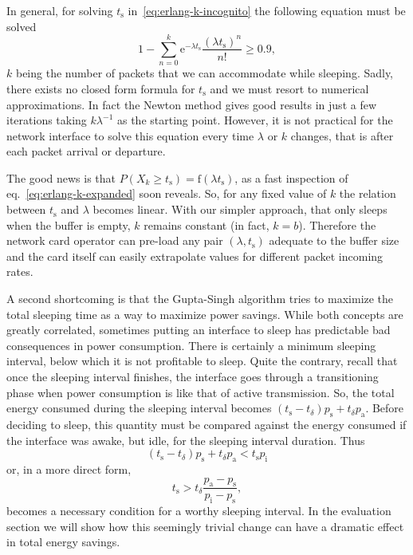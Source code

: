 \documentclass[conference,english]{IEEEtran}
\begin{document}
In general, for solving $t_{\mathrm{s}}$ in~\eqref{eq:erlang-k-incognito} the
following equation must be solved
\begin{equation}
  \label{eq:erlang-k-expanded}
  1-\sum_{n=0}^k \mathrm{e}^{-\lambda t_{\mathrm{s}}} 
  \frac{(\lambda t_{\mathrm{s}})^n}{n!} \ge 0.9,
\end{equation}
$k$ being the number of packets that we can accommodate while sleeping. Sadly,
there exists no closed form formula for $t_{\mathrm{s}}$ and we must resort to
numerical approximations. In fact the Newton method gives good results in just
a few iterations taking $k \lambda^{-1}$ as the starting point. However, it is
not practical for the network interface to solve this equation every time
$\lambda$ or $k$ changes, that is after each packet arrival or departure.

The good news is that $P(X_k \ge t_{\mathrm{s}}) = \mathrm{f}(\lambda
t_{\mathrm{s}})$, as a fast inspection of eq.~\eqref{eq:erlang-k-expanded}
soon reveals. So, for any fixed value of $k$ the relation between
$t_{\mathrm{s}}$ and $\lambda$ becomes linear. With our simpler approach, that
only sleeps when the buffer is empty, $k$ remains constant (in fact, $k=b$).
Therefore the network card operator can pre-load any pair $(\lambda,
t_{\mathrm{s}})$ adequate to the buffer size and the card itself can easily
extrapolate values for different packet incoming rates.

A second shortcoming is that the Gupta-Singh algorithm tries to maximize the
total sleeping time as a way to maximize power savings. While both concepts
are greatly correlated, sometimes putting an interface to sleep has
predictable bad consequences in power consumption. There is certainly a
minimum sleeping interval, below which it is not profitable to sleep. Quite
the contrary, recall that once the sleeping interval finishes, the interface
goes through a transitioning phase when power consumption is like that of
active transmission. So, the total energy consumed during the sleeping
interval becomes $(t_{\mathrm{s}} - t_{\delta})p_{\mathrm{s}} + t_{\delta}
p_{\mathrm{a}}$. Before deciding to sleep, this quantity must be compared
against the energy consumed if the interface was awake, but idle, for the
sleeping interval duration. Thus
\begin{equation*}
  (t_{\mathrm{s}}-t_{\delta}) p_{\mathrm{s}} + t_{\delta} p_{\mathrm{a}} < t_{\mathrm{s}}
  p_{\mathrm{i}}
\end{equation*}
or, in a more direct form,
\begin{equation}
  \label{eq:profitable-sleeping}
  t_{\mathrm{s}} > t_{\delta}\frac{p_{\mathrm{a}}-p_{\mathrm{s}}}{p_{\mathrm{i}} - p_{\mathrm{s}}},
\end{equation}
becomes a necessary condition for a worthy sleeping interval. In the
evaluation section we will show how this seemingly trivial change can have a
dramatic effect in total energy savings.
\end{document}
